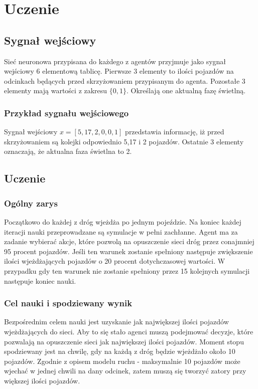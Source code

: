 \documentclass[12pt]{book}
\theoremstyle{plain}
\begin{document}
\section{Uczenie}
\subsection{Sygnał wejściowy}
Sieć neuronowa przypisana do każdego z agentów przyjmuje jako sygnał wejściowy 6 elementową tablicę. Pierwsze 3 elementy to ilości pojazdów na odcinkach będących przed skrzyżowaniem przypisanym do agenta. Pozostałe 3 elementy mają wartości z zakresu $\{0,1\}$. Określają one aktualną fazę świetlną. 
\subsubsection*{Przykład sygnału wejściowego}
Sygnał wejściowy $x=[5,17,2,0,0,1]$ przedstawia informację, iż przed skrzyżowaniem są kolejki odpowiednio 5,17 i 2 pojazdów. Ostatnie 3 elementy oznaczają, że aktualna faza świetlna to 2.

\subsection{Uczenie}
\subsubsection{Ogólny zarys}
Początkowo do każdej z dróg wjeżdża po jednym pojeździe. Na koniec każdej iteracji nauki przeprowadzane są symulacje w pełni zachłanne. Agent ma za zadanie wybierać akcje, które pozwolą na opuszczenie sieci dróg przez conajmniej 95 procent pojazdów. Jeśli ten warunek zostanie spełniony następuje zwiększenie ilości wjeżdżających pojazdów o 20 procent dotychczasowej wartości. W przypadku gdy ten warunek nie zostanie spełniony przez 15 kolejnych symulacji następuje koniec nauki. 
\subsubsection{Cel nauki i spodziewany wynik}
Bezpośrednim celem nauki jest uzyskanie jak największej ilości pojazdów wjeżdżających do sieci. Aby to się stało agenci muszą podejmować decyzje, które pozwalają na opuszczenie sieci jak największej ilości pojazdów. Moment stopu spodziewany jest na chwilę, gdy na każdą z dróg będzie wjeżdżało około 10 pojazdów. Zgodnie z opisem modelu ruchu - maksymalnie 10 pojazdów może wjechać w jednej chwili na dany odcinek, zatem muszą się tworzyć zatory przy większej ilości pojazdów.
\end{document}

